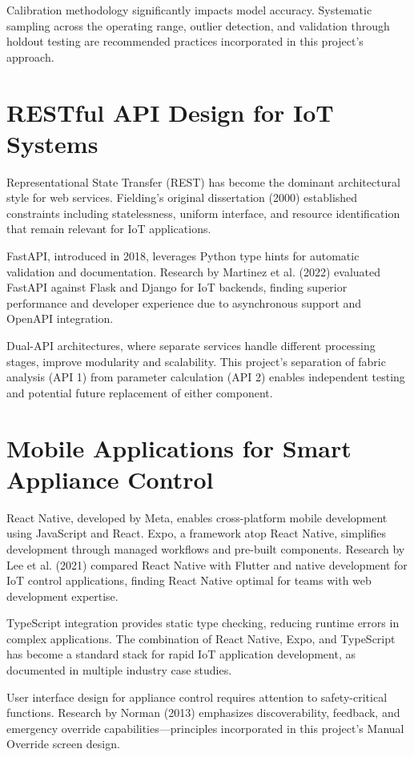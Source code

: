 Calibration methodology significantly impacts model accuracy. Systematic sampling across the operating range, outlier detection, and validation through holdout testing are recommended practices incorporated in this project's approach.

\section{RESTful API Design for IoT Systems}
Representational State Transfer (REST) has become the dominant architectural style for web services. Fielding's original dissertation (2000) established constraints including statelessness, uniform interface, and resource identification that remain relevant for IoT applications.

FastAPI, introduced in 2018, leverages Python type hints for automatic validation and documentation. Research by Martinez et al. (2022) evaluated FastAPI against Flask and Django for IoT backends, finding superior performance and developer experience due to asynchronous support and OpenAPI integration.

Dual-API architectures, where separate services handle different processing stages, improve modularity and scalability. This project's separation of fabric analysis (API 1) from parameter calculation (API 2) enables independent testing and potential future replacement of either component.

\section{Mobile Applications for Smart Appliance Control}
React Native, developed by Meta, enables cross-platform mobile development using JavaScript and React. Expo, a framework atop React Native, simplifies development through managed workflows and pre-built components. Research by Lee et al. (2021) compared React Native with Flutter and native development for IoT control applications, finding React Native optimal for teams with web development expertise.

TypeScript integration provides static type checking, reducing runtime errors in complex applications. The combination of React Native, Expo, and TypeScript has become a standard stack for rapid IoT application development, as documented in multiple industry case studies.

User interface design for appliance control requires attention to safety-critical functions. Research by Norman (2013) emphasizes discoverability, feedback, and emergency override capabilities—principles incorporated in this project's Manual Override screen design.


